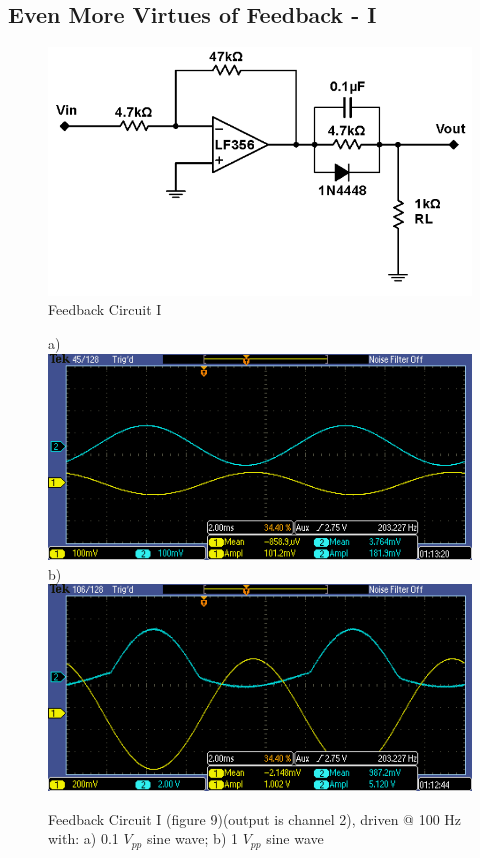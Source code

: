 \documentclass{article}
\begin{document}
\subsection{Even More Virtues of Feedback - I}
    \begin{figure}[H]
        \centering
        \includegraphics[scale = 0.5]{7.png}
        \caption{Feedback Circuit I ~\cite{webfig}}
        \label{fig:my_label}
    \end{figure}
    \begin{figure}[H]
        \centering
        a)\includegraphics[scale = 0.7]{7d.PNG}
        b)\includegraphics[scale = 0.7]{7c.PNG}
        \caption{Feedback Circuit I (figure 9)(output is channel 2), driven @ 100 Hz with: a) 0.1 $V_{pp}$ sine wave; b) 1 $V_{pp}$ sine wave}
        \label{fig:my_label}
    \end{figure}
\end{document}
